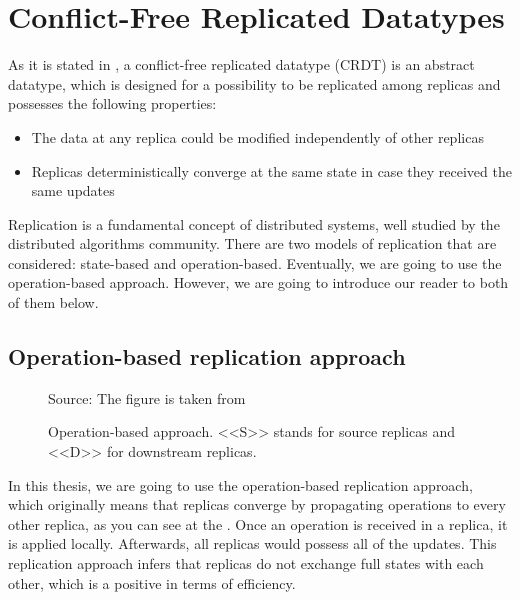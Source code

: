 \section{Conflict-Free Replicated Datatypes}

As it is stated in \citet{3}, a conflict-free replicated datatype (CRDT) is an abstract datatype, which is designed for a possibility to be replicated among replicas and possesses the following properties:


    \begin{itemize}
        \item {The data at any replica could be modified independently of other replicas}
        \item {Replicas deterministically converge at the same state in case they received the same updates}
    \end{itemize}

Replication is a fundamental concept of distributed systems, well studied by the distributed algorithms community\cite{2}. There are two models of replication that are considered: state-based and operation-based. Eventually, we are going to use the operation-based approach. However, we are going to introduce our reader to both of them below. 

\subsection*{Operation-based replication approach}

\begin{figure}[!htb]
    \begin{center}
    \def\svgwidth{\linewidth}
    
      {\scriptsize%
     Source: The figure is taken from \cite{2}}
    \caption {Operation-based approach. <<S>> stands for source replicas and <<D>> for downstream replicas. }
    \label{fig:theory1}
\end{center}
\end{figure}



In this thesis, we are going to use the operation-based replication approach, which originally means that replicas converge by propagating operations to every other replica\cite{3}, as you can see at the . Once an operation is received in a replica, it is applied locally. Afterwards, all replicas would possess all of the updates. This replication approach infers that replicas do not exchange full states with each other, which is a positive in terms of efficiency.

